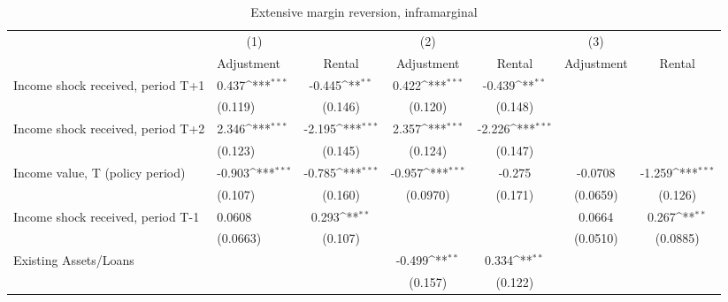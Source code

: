 \begin{table}[htbp]\centering
\def\sym#1{\ifmmode^{#1}\else\(^{#1}\)\fi}
\caption{Extensive margin reversion, inframarginal}
\begin{tabular}{p{0.8in}l*{5}{c}}
\hline\hline
                    &\multicolumn{1}{c}{(1)}         &                     &\multicolumn{1}{c}{(2)}         &                     &\multicolumn{1}{c}{(3)}         &                     \\
                    &  Adjustment         &      Rental         &  Adjustment         &      Rental         &  Adjustment         &      Rental         \\
\hline
Income shock received, period T+1&       0.437\sym{***}&      -0.445\sym{**} &       0.422\sym{***}&      -0.439\sym{**} &                     &                     \\
                    &     (0.119)         &     (0.146)         &     (0.120)         &     (0.148)         &                     &                     \\
Income shock received, period T+2&       2.346\sym{***}&      -2.195\sym{***}&       2.357\sym{***}&      -2.226\sym{***}&                     &                     \\
                    &     (0.123)         &     (0.145)         &     (0.124)         &     (0.147)         &                     &                     \\
Income value, T (policy period)&      -0.903\sym{***}&      -0.785\sym{***}&      -0.957\sym{***}&      -0.275         &     -0.0708         &      -1.259\sym{***}\\
                    &     (0.107)         &     (0.160)         &    (0.0970)         &     (0.171)         &    (0.0659)         &     (0.126)         \\
Income shock received, period T-1&      0.0608         &       0.293\sym{**} &                     &                     &      0.0664         &       0.267\sym{**} \\
                    &    (0.0663)         &     (0.107)         &                     &                     &    (0.0510)         &    (0.0885)         \\
Existing Assets/Loans&                     &                     &      -0.499\sym{**} &       0.334\sym{**} &                     &                     \\
                    &                     &                     &     (0.157)         &     (0.122)         &                     &                     \\

\end{tabular}
\end{table}
